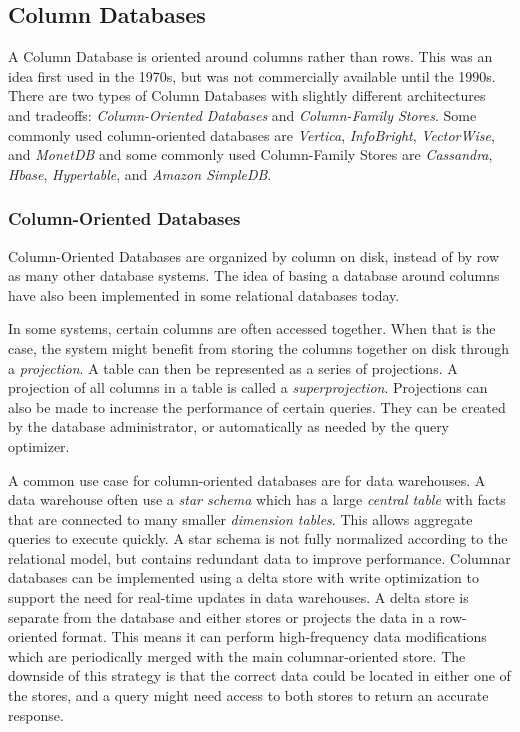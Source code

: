 \subsection{Column Databases}
\label{intro-col-db}

A Column Database is oriented around columns rather than rows. This was an idea first used in the 1970s, but was not commercially available until the 1990s.
There are two types of Column Databases with slightly different architectures and tradeoffs: \emph{Column-Oriented Databases} and \emph{Column-Family Stores}.
Some commonly used column-oriented databases are \emph{Vertica}, \emph{InfoBright}, \emph{VectorWise}, and \emph{MonetDB} and some commonly used Column-Family Stores are \emph{Cassandra}, \emph{Hbase}, \emph{Hypertable}, and \emph{Amazon SimpleDB}.

\subsubsection{Column-Oriented Databases}

Column-Oriented Databases are organized by column on disk, instead of by row as many other database systems.
The idea of basing a database around columns have also been implemented in some relational databases today.

In some systems, certain columns are often accessed together. When that is the case, the system might benefit from storing the columns together on disk through a \emph{projection}. A table can then be represented as a series of projections. A projection of all columns in a table is called a \emph{superprojection}. Projections can also be made to increase the performance of certain queries. They can be created by the database administrator, or automatically as needed by the query optimizer.

A common use case for column-oriented databases are for data warehouses.
A data warehouse often use a \emph{star schema} which has a large \emph{central table} with facts that are connected to many smaller \emph{dimension tables}. This allows aggregate queries to execute quickly. A star schema is not fully normalized according to the relational model, but contains redundant data to improve performance.
Columnar databases can be implemented using a delta store with write optimization to support the need for real-time updates in data warehouses. A delta store is separate from the database and either stores or projects the data in a row-oriented format. This means it can perform high-frequency data modifications which are periodically merged with the main columnar-oriented store. The downside of this strategy is that the correct data could be located in either one of the stores, and a query might need access to both stores to return an accurate response.

